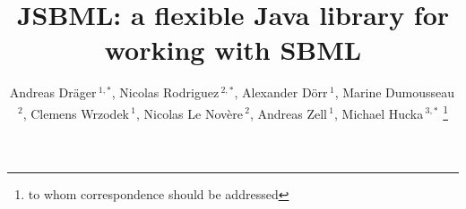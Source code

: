\documentclass{bioinfo}
\begin{document}
\application
\title[JSBML: The Java library for SBML]{JSBML: a flexible Java library
for working with SBML} \author[Dr\"ager \textit{et~al.}]{Andreas
Dr\"ager\,$^{1,*}$, Nicolas Rodriguez\,$^{2,*}$, 
Alexander D\"orr\,$^{1}$, 
Marine Dumousseau\,$^{2}$, 
Clemens Wrzodek\,$^{1}$, 
Nicolas Le Nov\`{e}re\,$^{2}$, 
Andreas Zell\,$^{1}$, 
Michael Hucka\,$^{3,*}$
\footnote{to whom correspondence should be addressed}}
\address{$^{1}$Center for Bioinformatics Tuebingen, University of Tuebingen, T\"ubingen, Germany.\\
$^{2}$European Bioinformatics Institute, Wellcome Trust Genome Campus, Hinxton, Cambridge, UK\\
$^{3}$Computing and Mathematical Sciences, California Institute of Technology, Pasadena, CA, USA}



\maketitle
\end{document}
